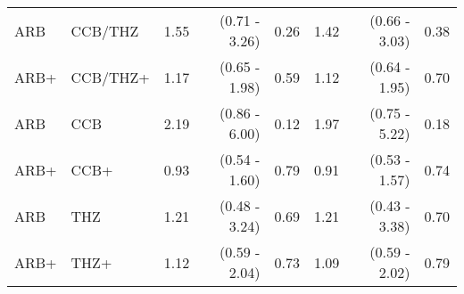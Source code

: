 \documentclass[11pt,]{article}
\begin{document}
\begin{table}[H]
{\begin{tabular}{llrrrrrr}
  ARB & CCB/THZ & 1.55 & (0.71 - 3.26) & 0.26 & 1.42 & (0.66 - 3.03) & 0.38 \\ 
  ARB+ & CCB/THZ+ & 1.17 & (0.65 - 1.98) & 0.59 & 1.12 & (0.64 - 1.95) & 0.70 \\ 
  ARB & CCB & 2.19 & (0.86 - 6.00) & 0.12 & 1.97 & (0.75 - 5.22) & 0.18 \\ 
  ARB+ & CCB+ & 0.93 & (0.54 - 1.60) & 0.79 & 0.91 & (0.53 - 1.57) & 0.74 \\ 
  ARB & THZ & 1.21 & (0.48 - 3.24) & 0.69 & 1.21 & (0.43 - 3.38) & 0.70 \\ 
  ARB+ & THZ+ & 1.12 & (0.59 - 2.04) & 0.73 & 1.09 & (0.59 - 2.02) & 0.79 \\ 
    \bottomrule
  \end{tabular}
  }
\end{table}
\begin{table}[H]
 \caption{Risk estimates for PAAS across propensity score stratifed, prevalent-user cohorts in the SIDIAP data source. We report uncalibrated and calibrated hazard ratios (HRs) and their 95\% confidence intervals (CIs). (+) indicates in-combination cohorts.}
\end{table}
\end{document}
